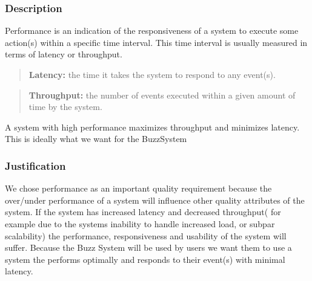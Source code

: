 \subsubsection*{Description}
		Performance is an indication of the responsiveness of a system to execute some action(s) within a specific time interval. This time interval is usually measured in terms of latency or throughput.
		\begin{quote}
			\textbf{Latency:} the time it takes the system to respond to any event(s).
		\end{quote} 
		\begin{quote}
			\textbf{Throughput:} the number of events executed within a given amount of time by the system.
		\end{quote} 
		A system with high performance maximizes throughput and minimizes latency. This is ideally what we want for the BuzzSystem
	\subsubsection*{Justification}
	 	We chose performance as an important quality requirement because the over/under performance of a system will influence other quality attributes of the system. If the system has increased latency and decreased throughput( for example due to the systems inability to handle increased load, or subpar scalability) the performance, responsiveness and usability of the system will suffer. Because the Buzz System will be used by users we want them to use a system the performs optimally and responds to their event(s) with minimal latency. 
